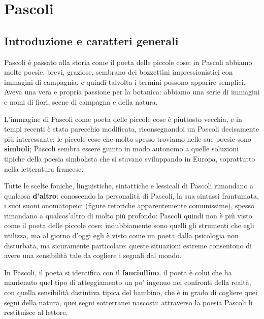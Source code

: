 \part{Pascoli}

\chapter{Introduzione e caratteri generali}

Pascoli è passato alla storia come il poeta delle piccole cose: in Pascoli abbiamo molte poesie, brevi, graziose, sembrano dei bozzettini impressionistici con immagini di campagnia, e quindi talvolta i termini possono apparire semplici.
Aveva una vera e propria passione per la botanica: abbiamo una serie di immagini e nomi di fiori, scene di campagna e della natura.

L'immagine di Pascoli come poeta delle piccole cose è piuttosto vecchia, e in tempi recenti è stata parecchio modificata, riconsegnandoi un Pascoli decisamente più interessante: le piccole cose che molto spesso troviamo nelle sue poesie sono \textbf{simboli}; Pascoli sembra essere giunto in modo autonomo a quelle soluzioni tipiche della poesia simbolista che si stavano sviluppando in Europa, soprattutto nella letteratura francese.

Tutte le scelte foniche, linguistiche, sintattiche e lessicali di Pascoli rimandano a qualcosa \textbf{d'altro}: conoscendo la personalità di Pascoli, la sua sintassi frantumata, i suoi suoni onomatopeici (figure retoriche apparentemente comunissime), spesso rimandano a qualcos'altro di molto più profondo:
Pascoli quindi non è più visto come il poeta delle piccole cose: indubbiamente sono quelli gli strumenti che egli utilizza, ma al giorno d'oggi egli è visto come un poeta dalla psicologia non disturbata, ma sicuramente particolare: queste situazioni estreme consentono di avere una sensibilità tale da cogliere i segnali dal mondo.

In Pascoli, il poeta si identifica con il \textbf{fanciullino}, il poeta è colui che ha mantenuto quel tipo di atteggiamento un po' ingenuo nei confronti della realtà, con quella sensibilità distintiva tipica del bambino, che è in grado di cogliere quei segni della natura, quei segni sotterranei nascosti: attraverso la poesia Pascoli li restituisce al lettore.

